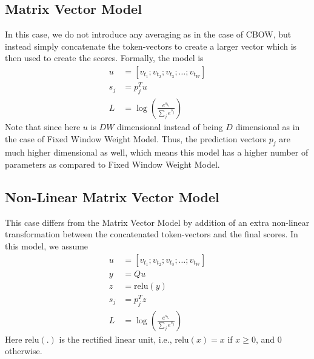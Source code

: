 \subsection{Matrix Vector Model}
In this case, we do not introduce any averaging as in the case of CBOW, but
instead simply concatenate the token-vectors to create a larger vector which is
then used to create the scores. Formally, the model is
\begin{align}
u &= [v_{t_1}; v_{t_2}; v_{t_3}; \ldots; v_{t_W}]\\
s_j &= p_j^Tu\\
L &= \log\left(\frac{e^{s_{t_o}}}{\sum_j{e^{s_j}}}\right)
\end{align}
Note that since here $u$ is $DW$ dimensional instead of being $D$ dimensional as
in the case of Fixed Window Weight Model. Thus, the prediction vectors $p_j$ are
much higher dimensional as well, which means this model has a higher number
of parameters as compared to Fixed Window Weight Model.

\subsection{Non-Linear Matrix Vector Model}
This case differs from the Matrix Vector Model by addition of an extra
non-linear transformation between the concatenated token-vectors and the final
scores. In this model, we assume
\begin{align}
u &= [v_{t_1}; v_{t_2}; v_{t_3}; \ldots; v_{t_W}]\\
y &= Qu\\
z &= \text{relu}(y)\\
s_j &= p_j^Tz\\
L &= \log\left(\frac{e^{s_{t_o}}}{\sum_j{e^{s_j}}}\right)
\end{align}
Here $\text{relu}(.)$ is the rectified linear unit, i.e., $\text{relu}(x) = x$
if $x \geq 0$, and $0$ otherwise.
